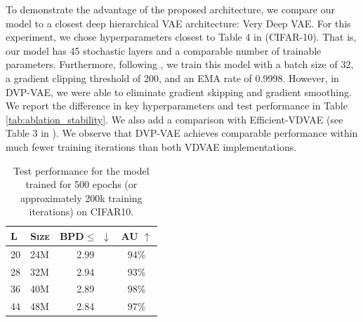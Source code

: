 To demonstrate the advantage of the proposed architecture, we compare our model to a closest deep hierarchical VAE architecture: Very Deep VAE. For this experiment, we chose hyperparameters closest to Table 4 in \cite{Child2020-ze} (CIFAR-10). That is, our model has 45 stochastic layers and a comparable number of trainable parameters. Furthermore, following \cite{Child2020-ze}, we train this model with a batch size of 32, a gradient clipping threshold of 200, and an EMA rate of 0.9998. 
However, in DVP-VAE, we were able to eliminate gradient skipping and gradient smoothing. 
We report the difference in key hyperparameters and test performance in Table \ref{tab:ablation_stability}. We also add a comparison with Efficient-VDVAE (see Table 3 in \cite{hazami2022efficientvdvae}).
We observe that DVP-VAE achieves comparable performance within much fewer training iterations than both VDVAE implementations. 

\begin{table}[t]
    \centering
    \caption{Test performance for the model trained for 500 epochs (or approximately 200k training iterations) on CIFAR10.}    \label{tab:increase_num_layers}
    \begin{tabular}{ll|cc}
        \toprule
         \textsc{L} & \textsc{Size} & \textsc{BPD}$\leq$ $\downarrow$ & \textsc{AU} $\uparrow$\\
        \midrule
        20 & 24M & 2.99 & 94\%\\
        28 & 32M & 2.94 & 93\% \\
        36 & 40M & 2.89 & 98\%\\
        44 & 48M & 2.84 & 97\%\\
        \bottomrule
    \end{tabular}
    \vskip 20pt
\end{table}

